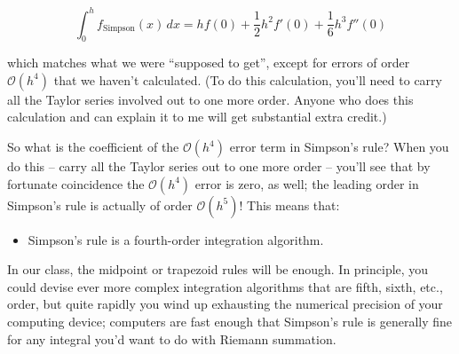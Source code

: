 \documentclass[12ampt]{article}
\begin{document}
 \begin{equation}
 \int_0^h f_{\mathrm{Simpson}}(x)\, dx = hf(0) + \frac{1}{2}h^2 f'(0) + \frac{1}{6} h^3 f''(0)
 \end{equation}

 which matches what we were ``supposed to get'', except for errors of order $\mathcal O(h^4)$ that we haven't calculated. (To do this calculation, you'll need to carry all the Taylor series involved out to one more order.
 Anyone who does this calculation and can explain it to me will get substantial extra credit.)

 So what is the coefficient of the $\mathcal O(h^4)$ error term in Simpson's rule? When you do this -- carry all the Taylor series out to one more order -- you'll see that by fortunate coincidence the $\mathcal O(h^4)$
 error is zero, as well; the leading order in Simpson's rule is actually of order $\mathcal O(h^5)$! This means that:

 \begin{itemize}
   \item{Simpson's rule is a fourth-order integration algorithm.}
 \end{itemize}

 In our class, the midpoint or trapezoid rules will be enough. In principle, you could devise ever more complex integration algorithms that are fifth, sixth, etc., order, but quite rapidly you wind up exhausting the numerical precision
 of your computing device; computers are fast enough that Simpson's rule is generally fine for any integral you'd want to do with Riemann summation.

 
\end{document}

